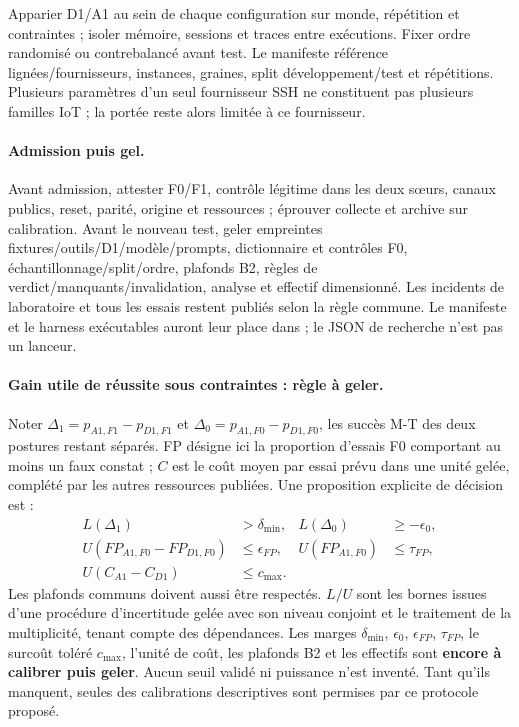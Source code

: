 \documentclass[11pt,a4paper]{article}
\newcommand{\code}[1]{{\small\ttfamily\path{#1}}}
\begin{document}
Apparier D1/A1 au sein de chaque configuration sur monde, répétition et contraintes ; isoler mémoire, sessions et traces entre exécutions. Fixer ordre randomisé ou contrebalancé avant test. Le manifeste référence lignées/fournisseurs, instances, graines, split développement/test et répétitions. Plusieurs paramètres d’un seul fournisseur SSH ne constituent pas plusieurs familles IoT ; la portée reste alors limitée à ce fournisseur.

\paragraph{Admission puis gel.}
Avant admission, attester F0/F1, contrôle légitime dans les deux sœurs, canaux publics, reset, parité, origine et ressources ; éprouver collecte et archive sur calibration. Avant le nouveau test, geler empreintes fixtures/outils/D1/modèle/prompts, dictionnaire et contrôles F0, échantillonnage/split/ordre, plafonds B2, règles de verdict/manquants/invalidation, analyse et effectif dimensionné. Les incidents de laboratoire et tous les essais restent publiés selon la règle commune. Le manifeste et le harness exécutables auront leur place dans \code{benchmarks/experiments/} ; le JSON de recherche n’est pas un lanceur.

\paragraph{Gain utile de réussite sous contraintes : règle à geler.}
Noter $\Delta_1=p_{A1,F1}-p_{D1,F1}$ et $\Delta_0=p_{A1,F0}-p_{D1,F0}$, les succès M-T des deux postures restant séparés. FP désigne ici la proportion d’essais F0 comportant au moins un faux constat ; $C$ est le coût moyen par essai prévu dans une unité gelée, complété par les autres ressources publiées. Une proposition explicite de décision est :
\begin{align*}
L(\Delta_1)&>\delta_{\min}, &L(\Delta_0)&\geq-\epsilon_0,\\
U(FP_{A1,F0}-FP_{D1,F0})&\leq\epsilon_{FP}, &U(FP_{A1,F0})&\leq\tau_{FP},\\
U(C_{A1}-C_{D1})&\leq c_{\max}.&&
\end{align*}
Les plafonds communs doivent aussi être respectés. $L/U$ sont les bornes issues d’une procédure d’incertitude gelée avec son niveau conjoint et le traitement de la multiplicité, tenant compte des dépendances. Les marges $\delta_{\min}$, $\epsilon_0$, $\epsilon_{FP}$, $\tau_{FP}$, le surcoût toléré $c_{\max}$, l’unité de coût, les plafonds B2 et les effectifs sont \textbf{encore à calibrer puis geler}. Aucun seuil validé ni puissance n’est inventé. Tant qu’ils manquent, seules des calibrations descriptives sont permises par ce protocole proposé.
\end{document}
